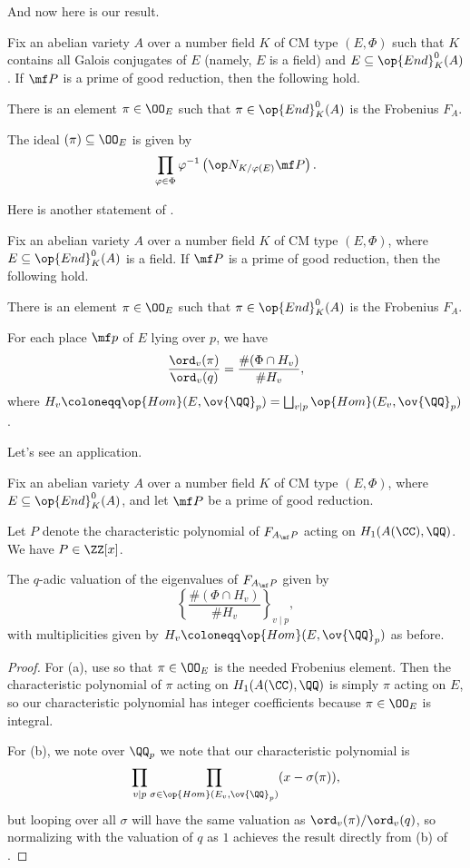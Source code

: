 \documentclass[../notes.tex]{subfiles}
\begin{document}
And now here is our result.
\begin{theorem} \label{thm:st}
	Fix an abelian variety $A$ over a number field $K$ of CM type $(E,\Phi)$ such that $K$ contains all Galois conjugates of $E$ (namely, $E$ is a field) and $E\subseteq\op{End}^0_K(A)$. If $\mf P$ is a prime of good reduction, then the following hold.
	\begin{listalph}
		\item There is an element $\pi\in\OO_E$ such that $\pi\in\op{End}^0_K(A)$ is the Frobenius $F_A$.
		\item The ideal $(\pi)\subseteq\OO_E$ is given by
		\[\prod_{\varphi\in\Phi}\varphi^{-1}\left(\op N_{K/\varphi(E)}\mf P\right).\]
	\end{listalph}
\end{theorem}
Here is another statement of .
\begin{theorem} \label{thm:st-2}
	Fix an abelian variety $A$ over a number field $K$ of CM type $(E,\Phi)$, where $E\subseteq\op{End}^0_K(A)$ is a field. If $\mf P$ is a prime of good reduction, then the following hold.
	\begin{listalph}
		\item There is an element $\pi\in\OO_E$ such that $\pi\in\op{End}^0_K(A)$ is the Frobenius $F_A$.
		\item For each place $\mf p$ of $E$ lying over $p$, we have
		\[\frac{\ord_v(\pi)}{\ord_v(q)}=\frac{\#(\Phi\cap H_v)}{\#H_v},\]
		where $H_v\coloneqq\op{Hom}(E,\ov{\QQ}_p)=\bigsqcup_{v\mid p}\op{Hom}(E_v,\ov{\QQ}_p)$.
	\end{listalph}
\end{theorem}
Let's see an application.
\begin{corollary}
	Fix an abelian variety $A$ over a number field $K$ of CM type $(E,\Phi)$, where $E\subseteq\op{End}^0_K(A)$, and let $\mf P$ be a prime of good reduction.
	\begin{listalph}
		\item Let $P$ denote the characteristic polynomial of $F_{A_\mf P}$ acting on $H_1(A(\CC),\QQ)$. We have $P\in\ZZ[x]$.
		\item The $q$-adic valuation of the eigenvalues of $F_{A_\mf P}$ given by
		\[\left\{\frac{\#(\Phi\cap H_v)}{\#H_v}\right\}_{v\mid p},\]
		with multiplicities given by $H_v\coloneqq\op{Hom}(E,\ov{\QQ}_p)$ as before.
	\end{listalph}
\end{corollary}
\begin{proof}
	For (a), use  so that $\pi\in\OO_E$ is the needed Frobenius element. Then the characteristic polynomial of $\pi$ acting on $H_1(A(\CC),\QQ)$ is simply $\pi$ acting on $E$, so our characteristic polynomial has integer coefficients because $\pi\in\OO_E$ is integral.

	For (b), we note over $\QQ_p$ we note that our characteristic polynomial is
	\[\prod_{v\mid p}\prod_{\sigma\in\op{Hom}(E_v,\ov{\QQ}_p)}(x-\sigma(\pi)),\]
	but looping over all $\sigma$ will have the same valuation as $\ord_v(\pi)/\ord_v(q)$, so normalizing with the valuation of $q$ as $1$ achieves the result directly from (b) of .
\end{proof}
\end{document}
